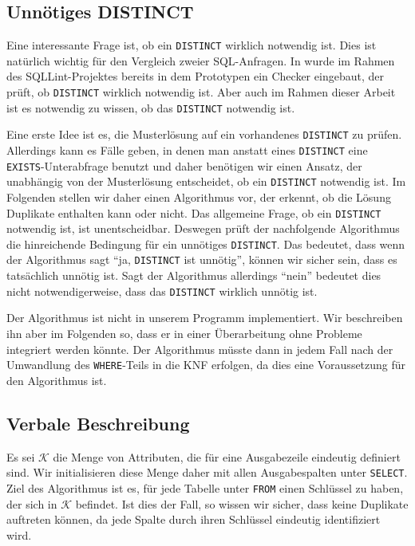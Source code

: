 \subsection{Unnötiges DISTINCT}

Eine interessante Frage ist, ob ein \verb|DISTINCT| wirklich notwendig ist. Dies ist natürlich wichtig für den Vergleich zweier SQL-Anfragen. In \cite{brass2} wurde im Rahmen des SQLLint-Projektes bereits in dem Prototypen ein Checker eingebaut, der prüft, ob \verb|DISTINCT| wirklich notwendig ist. Aber auch im Rahmen dieser Arbeit ist es notwendig zu wissen, ob das \verb|DISTINCT| notwendig ist. 

Eine erste Idee ist es, die Musterlösung auf ein vorhandenes \verb|DISTINCT| zu prüfen. Allerdings kann es Fälle geben, in denen man anstatt eines \verb|DISTINCT| eine \verb|EXISTS|-Unterabfrage benutzt und daher benötigen wir einen Ansatz, der unabhängig von der Musterlösung entscheidet, ob ein \verb|DISTINCT| notwendig ist.  Im Folgenden stellen wir daher einen Algorithmus vor, der erkennt, ob die Lösung Duplikate enthalten kann oder nicht. Das allgemeine Frage, ob ein \verb|DISTINCT| notwendig ist, ist unentscheidbar. Deswegen prüft der nachfolgende Algorithmus die hinreichende Bedingung für ein unnötiges \verb|DISTINCT|. Das bedeutet, dass wenn der Algorithmus sagt "`ja, \verb|DISTINCT| ist unnötig"', können wir sicher sein, dass es tatsächlich unnötig ist. Sagt der Algorithmus allerdings "`nein"' bedeutet dies nicht notwendigerweise, dass das \verb|DISTINCT| wirklich unnötig ist. 

Der Algorithmus ist nicht in unserem Programm implementiert. Wir beschreiben ihn aber im Folgenden so, dass er in einer Überarbeitung ohne Probleme integriert werden könnte. Der Algorithmus müsste dann in jedem Fall nach der Umwandlung des \verb|WHERE|-Teils in die KNF erfolgen, da dies eine Voraussetzung für den Algorithmus ist.

\subsection{Verbale Beschreibung}

Es sei $\mathcal{K}$ die Menge von Attributen, die für eine Ausgabezeile eindeutig definiert sind. Wir initialisieren diese Menge daher mit allen Ausgabespalten unter \verb|SELECT|. Ziel des Algorithmus ist es, für jede Tabelle unter \verb|FROM| einen Schlüssel zu haben, der sich in $\mathcal{K}$ befindet. Ist dies der Fall, so wissen wir sicher, dass keine Duplikate auftreten können, da jede Spalte durch ihren Schlüssel eindeutig identifiziert wird. 

